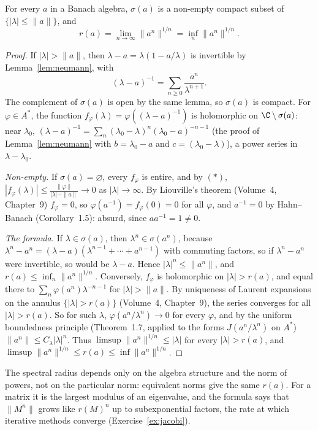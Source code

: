 \begin{theorem}[Gelfand]\label{thm:spectrum}
For every $a$ in a Banach algebra, $\sigma(a)$ is a non-empty compact subset of $\{|\lambda|\le\|a\|\}$, and
\[r(a)=\lim_{n\to\infty}\|a^n\|^{1/n}=\inf_n\|a^n\|^{1/n}.\]
\end{theorem}
\begin{proof}
If $|\lambda|>\|a\|$, then $\lambda-a=\lambda(1-a/\lambda)$ is invertible by Lemma~\ref{lem:neumann}, with
\[(\lambda-a)^{-1}=\sum_{n\ge0}\frac{a^n}{\lambda^{n+1}}.\tag{$*$}\]
The complement of $\sigma(a)$ is open by the same lemma, so $\sigma(a)$ is compact. For $\varphi\in A^*$, the function $f_\varphi(\lambda)=\varphi((\lambda-a)^{-1})$ is holomorphic on $\C\setminus\sigma(a)$: near $\lambda_0$,
$(\lambda-a)^{-1}=\sum_n(\lambda_0-\lambda)^n(\lambda_0-a)^{-n-1}$ (the proof of Lemma~\ref{lem:neumann} with $b=\lambda_0-a$ and $c=(\lambda_0-\lambda)$), a power series in $\lambda-\lambda_0$.

\emph{Non-empty.} If $\sigma(a)=\varnothing$, every $f_\varphi$ is entire, and by $(*)$, $|f_\varphi(\lambda)|\le\frac{\|\varphi\|}{|\lambda|-\|a\|}\to0$ as $|\lambda|\to\infty$. By Liouville's theorem (Volume~4, Chapter~9) $f_\varphi=0$, so
$\varphi(a^{-1})=f_\varphi(0)=0$ for all $\varphi$, and $a^{-1}=0$ by Hahn--Banach (Corollary~1.5): absurd, since $aa^{-1}=1\ne0$.

\emph{The formula.} If $\lambda\in\sigma(a)$, then $\lambda^n\in\sigma(a^n)$, because $\lambda^n-a^n=(\lambda-a)(\lambda^{n-1}+\cdots+a^{n-1})$ with commuting factors, so if $\lambda^n-a^n$ were invertible, so would be $\lambda-a$. Hence
$|\lambda|^n\le\|a^n\|$, and $r(a)\le\inf_n\|a^n\|^{1/n}$. Conversely, $f_\varphi$ is holomorphic on $|\lambda|>r(a)$, and equal there to $\sum_n\varphi(a^n)\lambda^{-n-1}$ for $|\lambda|>\|a\|$. By uniqueness of Laurent expansions on the
annulus $\{|\lambda|>r(a)\}$ (Volume~4, Chapter~9), the series converges for all $|\lambda|>r(a)$. So for such $\lambda$, $\varphi(a^n/\lambda^n)\to0$ for every $\varphi$, and by the uniform boundedness principle
(Theorem~1.7, applied to the forms $J(a^n/\lambda^n)$ on $A^*$) $\|a^n\|\le C_\lambda|\lambda|^n$. Thus $\limsup\|a^n\|^{1/n}\le|\lambda|$ for every $|\lambda|>r(a)$, and $\limsup\|a^n\|^{1/n}\le r(a)\le\inf\|a^n\|^{1/n}$.
\end{proof}

The spectral radius depends only on the algebra structure and the norm of powers, not on the particular norm: equivalent norms give the same $r(a)$. For a matrix it is the largest modulus of an eigenvalue, and the formula says
that $\|M^n\|$ grows like $r(M)^n$ up to subexponential factors, the rate at which iterative methods converge (Exercise~\ref{ex:jacobi}).

